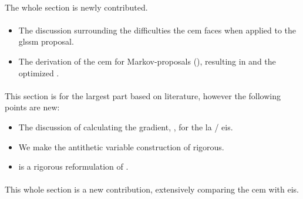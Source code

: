 \begin{tcolorbox}[title={Contributions}]
    \paragraph{}
    The whole section is newly contributed.

    \paragraph{}
    \begin{itemize}
        \item The discussion surrounding the difficulties the \acrshort{cem} faces when applied to the \acrshort{glssm} proposal.
        \item The derivation of the \acrshort{cem} for Markov-proposals (), resulting in  and the optimized .
    \end{itemize}

    \paragraph{}
    This section is for the largest part based on literature, however the following points are new:
    \begin{itemize}
        \item The discussion of calculating the gradient, , for the \acrshort{la} / \acrshort{eis}.
        \item We make the antithetic variable construction of \citep{Durbin1997Monte} rigorous. 
        \item {} is a rigorous reformulation of \citep[Section 11.5]{Durbin2012Time}.
    \end{itemize}

    \paragraph{} 
    This whole section is a new contribution, extensively comparing the \acrshort{cem} with \acrshort{eis}.
\end{tcolorbox}
\newpage

